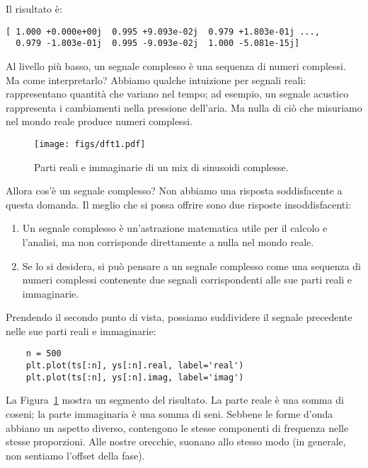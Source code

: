 \documentclass[12pt,a4paper]{book}
\begin{document}
Il risultato è:

\begin{verbatim} 
[ 1.000 +0.000e+00j  0.995 +9.093e-02j  0.979 +1.803e-01j ...,
  0.979 -1.803e-01j  0.995 -9.093e-02j  1.000 -5.081e-15j]
 \end{verbatim} 

Al livello più basso, un segnale complesso è una sequenza di numeri complessi. Ma come interpretarlo? Abbiamo qualche intuizione per segnali reali: rappresentano quantità che variano nel tempo; ad esempio, un segnale acustico rappresenta i cambiamenti nella pressione dell'aria. Ma nulla di ciò che misuriamo nel mondo reale produce numeri complessi.

\begin{figure} 

\centerline{\texttt{[image: figs/dft1.pdf]}} \caption{Parti reali e immaginarie di un mix di sinusoidi complesse.} \label{fig.dft1} \end{figure} 

Allora cos'è un segnale complesso? Non abbiamo una risposta soddisfacente a questa domanda. Il meglio che si possa offrire sono due risposte insoddisfacenti:

\begin{enumerate} 

\item Un segnale complesso è un'astrazione matematica utile per il calcolo e l'analisi, ma non corrisponde direttamente a nulla nel mondo reale.

\item Se lo si desidera, si può pensare a un segnale complesso come una sequenza di numeri complessi contenente due segnali corrispondenti alle sue parti reali e immaginarie.

\end{enumerate} 

Prendendo il secondo punto di vista, possiamo suddividere il segnale precedente nelle sue parti reali e immaginarie:

\begin{verbatim} 
    n = 500
    plt.plot(ts[:n], ys[:n].real, label='real')
    plt.plot(ts[:n], ys[:n].imag, label='imag')
 \end{verbatim} 

La Figura~\ref{fig.dft1} mostra un segmento del risultato. La parte reale è una somma di coseni; la parte immaginaria è una somma di seni. Sebbene le forme d'onda abbiano un aspetto diverso, contengono le stesse componenti di frequenza nelle stesse proporzioni. Alle nostre orecchie, suonano allo stesso modo (in generale, non sentiamo l'offset della fase).
\end{document}
